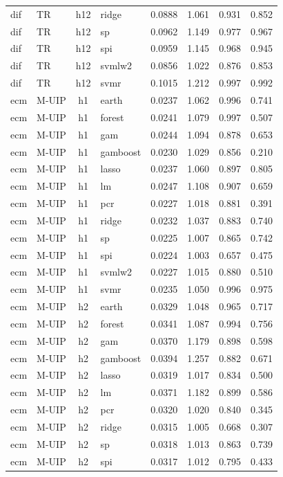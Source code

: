 \begin{ThreePartTable}
\begin{longtable}[t]{llclcccc}
dif & TR & h12 & ridge & 0.0888 & 1.061 & 0.931 & 0.852\\
dif & TR & h12 & sp & 0.0962 & 1.149 & 0.977 & 0.967\\
dif & TR & h12 & spi & 0.0959 & 1.145 & 0.968 & 0.945\\
dif & TR & h12 & svmlw2 & 0.0856 & 1.022 & 0.876 & 0.853\\
dif & TR & h12 & svmr & 0.1015 & 1.212 & 0.997 & 0.992\\
\addlinespace
ecm & M-UIP & h1 & earth & 0.0237 & 1.062 & 0.996 & 0.741\\
ecm & M-UIP & h1 & forest & 0.0241 & 1.079 & 0.997 & 0.507\\
ecm & M-UIP & h1 & gam & 0.0244 & 1.094 & 0.878 & 0.653\\
ecm & M-UIP & h1 & gamboost & 0.0230 & 1.029 & 0.856 & 0.210\\
ecm & M-UIP & h1 & lasso & 0.0237 & 1.060 & 0.897 & 0.805\\
ecm & M-UIP & h1 & lm & 0.0247 & 1.108 & 0.907 & 0.659\\
ecm & M-UIP & h1 & pcr & 0.0227 & 1.018 & 0.881 & 0.391\\
ecm & M-UIP & h1 & ridge & 0.0232 & 1.037 & 0.883 & 0.740\\
ecm & M-UIP & h1 & sp & 0.0225 & 1.007 & 0.865 & 0.742\\
ecm & M-UIP & h1 & spi & 0.0224 & 1.003 & 0.657 & 0.475\\
ecm & M-UIP & h1 & svmlw2 & 0.0227 & 1.015 & 0.880 & 0.510\\
ecm & M-UIP & h1 & svmr & 0.0235 & 1.050 & 0.996 & 0.975\\
\addlinespace
ecm & M-UIP & h2 & earth & 0.0329 & 1.048 & 0.965 & 0.717\\
ecm & M-UIP & h2 & forest & 0.0341 & 1.087 & 0.994 & 0.756\\
ecm & M-UIP & h2 & gam & 0.0370 & 1.179 & 0.898 & 0.598\\
ecm & M-UIP & h2 & gamboost & 0.0394 & 1.257 & 0.882 & 0.671\\
ecm & M-UIP & h2 & lasso & 0.0319 & 1.017 & 0.834 & 0.500\\
ecm & M-UIP & h2 & lm & 0.0371 & 1.182 & 0.899 & 0.586\\
ecm & M-UIP & h2 & pcr & 0.0320 & 1.020 & 0.840 & 0.345\\
ecm & M-UIP & h2 & ridge & 0.0315 & 1.005 & 0.668 & 0.307\\
ecm & M-UIP & h2 & sp & 0.0318 & 1.013 & 0.863 & 0.739\\
ecm & M-UIP & h2 & spi & 0.0317 & 1.012 & 0.795 & 0.433\\

\end{longtable}
\end{ThreePartTable}
